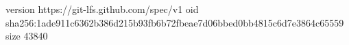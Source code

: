 version https://git-lfs.github.com/spec/v1
oid sha256:1ade911c6362b386d215b93fb6b72fbeae7d06bbed0bb4815c6d7e3864c65559
size 43840

